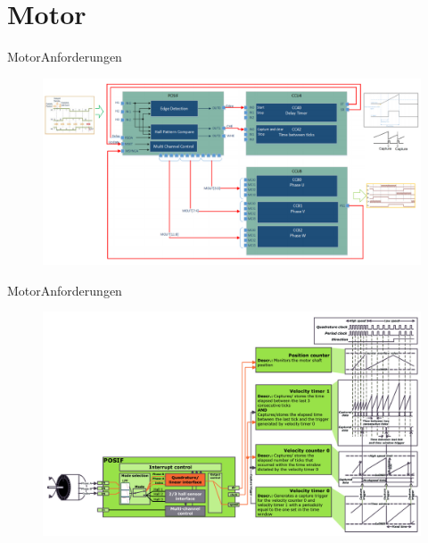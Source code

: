 \section{Motor}
	
	\begin{frame}{Motor}{Anforderungen}

		\begin{figure}[htbp]
			\centering
			\includegraphics[width=\textwidth]{Motor/interconnects.png}
		\end{figure}
	\end{frame}
	
\begin{frame}{Motor}{Anforderungen}
	
	\begin{figure}[htbp]
		\centering
		\includegraphics[width=\textwidth]{Motor/quadrature.jpg}
	\end{figure}
\end{frame}
